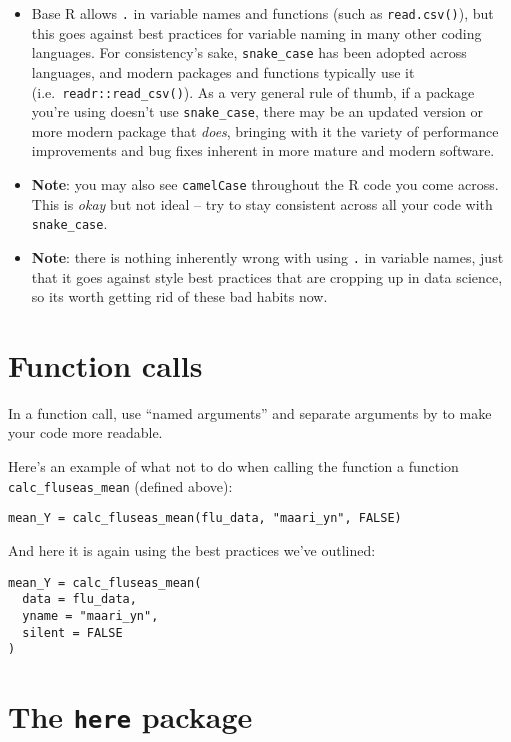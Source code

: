 \documentclass[
]{book}
\begin{document}
\begin{itemize}
\item
  Base R allows \texttt{.} in variable names and functions (such as \texttt{read.csv()}), but this goes against best practices for variable naming in many other coding languages. For consistency's sake, \texttt{snake\_case} has been adopted across languages, and modern packages and functions typically use it (i.e.~\texttt{readr::read\_csv()}). As a very general rule of thumb, if a package you're using doesn't use \texttt{snake\_case}, there may be an updated version or more modern package that \emph{does}, bringing with it the variety of performance improvements and bug fixes inherent in more mature and modern software.
\item
  \textbf{Note}: you may also see \texttt{camelCase} throughout the R code you come across. This is \emph{okay} but not ideal -- try to stay consistent across all your code with \texttt{snake\_case}.
\item
  \textbf{Note}: there is nothing inherently wrong with using \texttt{.} in variable names, just that it goes against style best practices that are cropping up in data science, so its worth getting rid of these bad habits now.
\end{itemize}

\hypertarget{function-calls}{%
\section{Function calls}\label{function-calls}}

In a function call, use ``named arguments'' and separate arguments by to make your code more readable.

Here's an example of what not to do when calling the function a function \texttt{calc\_fluseas\_mean} (defined above):

\begin{verbatim}
mean_Y = calc_fluseas_mean(flu_data, "maari_yn", FALSE)
\end{verbatim}

And here it is again using the best practices we've outlined:

\begin{verbatim}
mean_Y = calc_fluseas_mean(
  data = flu_data, 
  yname = "maari_yn",
  silent = FALSE
)
\end{verbatim}

\hypertarget{the-here-package}{%
\section{\texorpdfstring{The \texttt{here} package}{The here package}}\label{the-here-package}}
\end{document}
